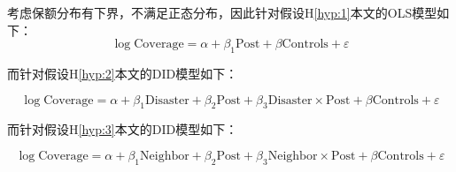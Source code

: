 

考虑保额分布有下界，不满足正态分布，因此针对假设H\ref{hyp:1}本文的OLS模型如下：
\begin{equation}
    \log\text{Coverage}=\alpha+\beta_1\text{Post}+\beta\text{Controls}+\varepsilon
    \label{eq:OLS}
\end{equation}

而针对假设H\ref{hyp:2}本文的DID模型如下：

\begin{equation}
    \log\text{Coverage}=\alpha+\beta_1\text{Disaster}+\beta_2\text{Post}+\beta_3\text{Disaster}\times\text{Post}+\beta\text{Controls}+\varepsilon
    \label{eq:DID_1}
\end{equation}

而针对假设H\ref{hyp:3}本文的DID模型如下：

\begin{equation}
    \log\text{Coverage}=\alpha+\beta_1\text{Neighbor}+\beta_2\text{Post}+\beta_3\text{Neighbor}\times\text{Post}+\beta\text{Controls}+\varepsilon
    \label{eq:DID_2}
\end{equation}


